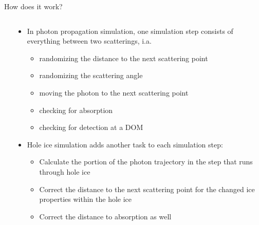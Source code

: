 
\begin{frame}[fragile]{How does it work?}

  \begin{columns}
    \begin{column}{0.5\textwidth}
    \end{column}
    \begin{column}{0.5\textwidth}

      \begin{itemize}
        \item<1> In photon propagation simulation, one simulation step consists of everything between two scatterings, i.a.
          \begin{itemize}
            \item randomizing the distance to the next scattering point
            \item randomizing the scattering angle
            \item moving the photon to the next scattering point
            \item checking for absorption
            \item checking for detection at a DOM
          \end{itemize}

        \item<2> Hole ice simulation adds another task to each simulation step:
          \begin{itemize}
            \item Calculate the portion of the photon trajectory in the step that runs through hole ice
            \item Correct the distance to the next scattering point for the changed ice properties within the hole ice
            \item Correct the distance to absorption as well
          \end{itemize}
      \end{itemize}

    \end{column}
  \end{columns}

\end{frame}